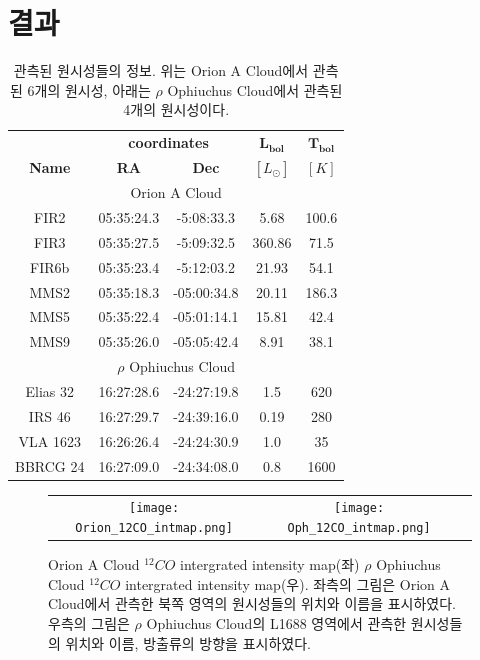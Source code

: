 \section{결과}

\begin{table}[h!]
	\begin{center}
		\begin{tabular}{c|c|c|c|c}
			\toprule
			& \multicolumn{2}{c|}{\textbf{coordinates}} & $\mathbf{L_{bol}}$ & $\mathbf{T_{bol}}$\\
			\textbf{Name} & \textbf{RA} & \textbf{Dec} & ${[L_{\odot}]}$ & $[K]$\\
			\midrule
			\multicolumn{5}{c}{Orion A Cloud}\\
			\midrule
			\centering
			FIR2 & 05:35:24.3 & -5:08:33.3 & 5.68 & 100.6\\
			FIR3 & 05:35:27.5 & -5:09:32.5 & 360.86 & 71.5\\
			FIR6b & 05:35:23.4 & -5:12:03.2 & 21.93 & 54.1\\
			MMS2 & 05:35:18.3 & -05:00:34.8 & 20.11 & 186.3\\
			MMS5 & 05:35:22.4 & -05:01:14.1 & 15.81 & 42.4\\
			MMS9 & 05:35:26.0 & -05:05:42.4 & 8.91 & 38.1\\
			\midrule
			\multicolumn{5}{c}{$\rho$ Ophiuchus Cloud}\\
			\midrule
			\centering
			Elias 32 & 16:27:28.6 & -24:27:19.8 & 1.5 & 620\\
			IRS 46 & 16:27:29.7 & -24:39:16.0 & 0.19 & 280\\
			VLA 1623 & 16:26:26.4 & -24:24:30.9 & 1.0 & 35\\
			BBRCG 24 & 16:27:09.0 & -24:34:08.0 & 0.8 & 1600\\
		\end{tabular}
	\end{center}
	\caption{관측된 원시성들의 정보. 위는 Orion A Cloud에서 관측된 6개의 원시성, 아래는 $\rho$ Ophiuchus Cloud에서 관측된 4개의 원시성이다.}
\end{table}



\begin{figure}[h!]
	\begin{center}
		\begin{tabular}{ccc}
			\texttt{[image: Orion\_12CO\_intmap.png]} & \texttt{[image: Oph\_12CO\_intmap.png]}
		\end{tabular}
	\end{center}
	\caption{Orion A Cloud $^{12}CO$ intergrated intensity map(좌) $\rho$ Ophiuchus Cloud $^{12}CO$ intergrated intensity map(우). 좌측의 그림은 Orion A Cloud에서 관측한 북쪽 영역의 원시성들의 위치와 이름을 표시하였다. 우측의 그림은 $\rho$ Ophiuchus Cloud의 L1688 영역에서 관측한 원시성들의 위치와 이름, 방출류의 방향을 표시하였다.}
\end{figure}

